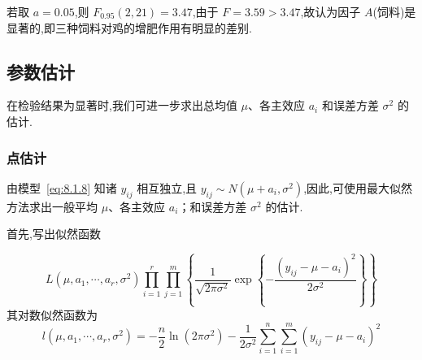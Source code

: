 若取 $a=0.05$,则 $F_{0.95} (2, 21)=3.47$,由于 $F=3.59>3.47$,故认为因子 $A$(饲料)是显著的,即三种饲料对鸡的增肥作用有明显的差别.

\subsection{参数估计}

在检验结果为显著时,我们可进一步求出总均值 $\mu$、各主效应 $a_i$ 和误差方差 $\sigma^2$ 的估计.

\subsubsection{点估计}

由模型~\eqref{eq:8.1.8} 知诸 $y_{ij}$ 相互独立,且 $y_{ij}\sim N(\mu+a_i,\sigma^2)$,因此,可使用最大似然方法求出一般平均 $\mu$、各主效应 $a_i$；和误差方差 $\sigma^2$ 的估计.

首先,写出似然函数

\begin{equation*}
  L\left(\mu, a_{1}, \cdots, a_{r}, \sigma^{2}\right) \prod_{i=1}^{r} \prod_{j=1}^{m}\left\{\frac{1}{\sqrt{2 \pi \sigma^{2}}} \exp \left\{-\frac{\left(y_{i j}-\mu-a_{i}\right)^{2}}{2 \sigma^{2}}\right\}\right\}
\end{equation*}
其对数似然函数为
\begin{equation*}
  l\left(\mu, a_{1}, \cdots, a_{r}, \sigma^{2}\right)=-\frac{n}{2} \ln \left(2 \pi \sigma^{2}\right)-\frac{1}{2 \sigma^{2}} \sum_{i=1}^{n} \sum_{i=1}^{m}\left(y_{i j}-\mu-a_{i}\right)^{2}
\end{equation*}

